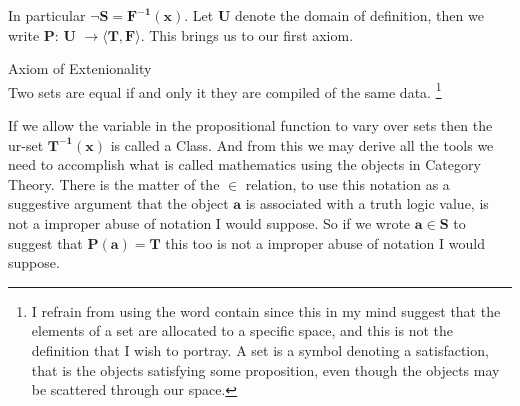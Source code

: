 \documentclass[12pt]{article}
\begin{document}
In particular $\lnot \mathbf{S}= \mathbf{F^{-1}(x)}$. Let \textbf{U} denote the domain of definition, then we write \textbf{P}: \textbf{U} $\longrightarrow \langle \textbf{T}, \textbf{F} \rangle$. This brings us to our first axiom. 
\begin{mydef}{Axiom of Extenionality}\\
Two sets are equal if and only it they are compiled of the same data. \footnote{I refrain from using the word contain since this in my mind suggest that the elements of a set are allocated to a specific space, and this is not the definition that I wish to portray. A set is a symbol denoting a satisfaction, that is the objects satisfying some proposition, even though the objects may be scattered through our space. }
\end{mydef}
If we allow the variable in the propositional function to vary over sets then the ur-set $\mathbf{T^{-1}(x)}$ is called a Class. And from this we may derive all the tools we need to accomplish what is called mathematics using the objects in Category Theory. There is the matter of the $\in$ relation, to use this notation as a suggestive argument that the object $\mathbf{a}$ is associated with a truth logic value, is not a improper abuse of notation I would suppose. So if we wrote $\mathbf{a} \in \mathbf{S}$ to suggest that $\mathbf{P(a)}=\mathbf{T}$ this too is not a improper abuse of notation I would suppose.  
\end{document}
